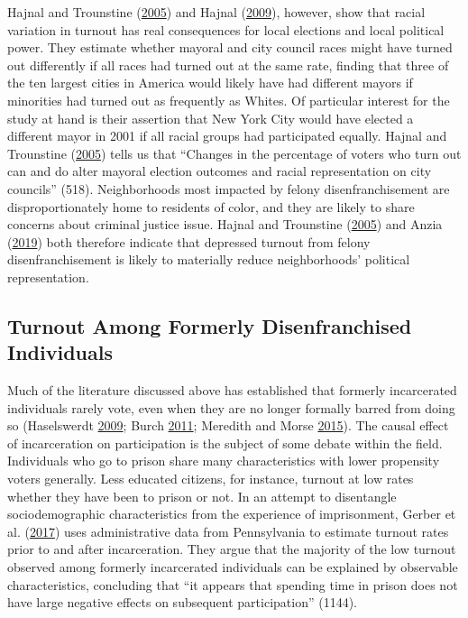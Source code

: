 \documentclass[
  12pt,
]{article}
\begin{document}
Hajnal and Trounstine (\protect\hyperlink{ref-Hajnal2005}{2005}) and Hajnal (\protect\hyperlink{ref-Hajnal2009}{2009}), however, show that racial variation in turnout has real consequences for local elections and local political power. They estimate whether mayoral and city council races might have turned out differently if all races had turned out at the same rate, finding that three of the ten largest cities in America would likely have had different mayors if minorities had turned out as frequently as Whites. Of particular interest for the study at hand is their assertion that New York City would have elected a different mayor in 2001 if all racial groups had participated equally. Hajnal and Trounstine (\protect\hyperlink{ref-Hajnal2005}{2005}) tells us that ``Changes in the percentage of voters who turn out can and do alter mayoral election outcomes and racial representation on city councils'' (518). Neighborhoods most impacted by felony disenfranchisement are disproportionately home to residents of color, and they are likely to share concerns about criminal justice issue. Hajnal and Trounstine (\protect\hyperlink{ref-Hajnal2005}{2005}) and Anzia (\protect\hyperlink{ref-Anzia2019}{2019}) both therefore indicate that depressed turnout from felony disenfranchisement is likely to materially reduce neighborhoods' political representation.

\hypertarget{turnout-among-formerly-disenfranchised-individuals}{%
\subsection*{Turnout Among Formerly Disenfranchised Individuals}\label{turnout-among-formerly-disenfranchised-individuals}}

Much of the literature discussed above has established that formerly incarcerated individuals rarely vote, even when they are no longer formally barred from doing so (Haselswerdt \protect\hyperlink{ref-Haselswerdt2009}{2009}; Burch \protect\hyperlink{ref-Burch2011}{2011}; Meredith and Morse \protect\hyperlink{ref-Meredith2015}{2015}). The causal effect of incarceration on participation is the subject of some debate within the field. Individuals who go to prison share many characteristics with lower propensity voters generally. Less educated citizens, for instance, turnout at low rates whether they have been to prison or not. In an attempt to disentangle sociodemographic characteristics from the experience of imprisonment, Gerber et al. (\protect\hyperlink{ref-Gerber2017}{2017}) uses administrative data from Pennsylvania to estimate turnout rates prior to and after incarceration. They argue that the majority of the low turnout observed among formerly incarcerated individuals can be explained by observable characteristics, concluding that ``it appears that spending time in prison does not have large negative effects on subsequent participation'' (1144).
\end{document}
